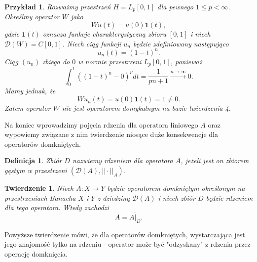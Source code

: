 \documentclass[12pt]{article}
\newtheorem{tw}{Twierdzenie}
\newtheorem{df}{Definicja}
\newtheorem{prz}{Przykład}
\begin{document}
\begin{prz}
	Rozważmy przestrzeń $H = L_p[0,1]$ dla pewnego $1\leq p < \infty$. Określmy operator $W$ jako \begin{displaymath}
		Wu(t) = u(0)\pmb{1}(t),
	\end{displaymath}
	gdzie $\pmb{1}(t)$ oznacza funkcje charakterystyczną zbioru $[0,1]$ i niech $\mathcal{D}(W) = C[0,1]$. Niech ciąg funkcji $u_n$ będzie zdefiniowany następująco
	\begin{displaymath}
		u_n(t) = (1-t)^n.
	\end{displaymath}
	Ciąg $(u_n)$ zbiega do $0$ w normie przestrzeni $ L_p[0,1]$, ponieważ 
	\begin{displaymath}
		\int_0^1\left((1-t)^n - 0\right)^pdt = \frac{1}{pn+1} \stackrel{n\to \infty}{\to } 0.
	\end{displaymath}
	Mamy jednak, że 
	\begin{displaymath}
		Wu_n(t) = u(0)\pmb{1}(t) = 1 \neq 0.
	\end{displaymath}
	Zatem operator $W$ nie jest operatorem domykalnym na bazie twierdzenia 4.
\end{prz}

Na koniec wprowadzimy pojęcia rdzenia dla operatora liniowego $A$ oraz wypowiemy związane z nim twierdzenie niosące duże konsekwencje dla operatorów domkniętych.

\begin{df}
	Zbiór $D$ nazwiemy rdzeniem dla operatora $A$, jeżeli jest on zbiorem gęstym w przestrzeni $\left(\mathcal{D}(A), ||\cdot ||_A\right)$.
\end{df}

\begin{tw}
	Niech $A\colon X\to Y$ będzie operatorem domkniętym określonym na przestrzeniach Banacha $X$ i $Y$ z dziedziną $\mathcal{D}(A)$ i niech zbiór $D$ będzie rdzeniem dla tego operatora. Wtedy zachodzi
	\begin{displaymath}
		A = \overline{A|_{D}}.
	\end{displaymath}
\end{tw}
Powyższe twierdzenie mówi, że dla operatorów domkniętych, wystarczająca jest jego znajomość tylko na rdzeniu - operator może być "odzyskany" z rdzenia przez operację domknięcia.
\end{document}
